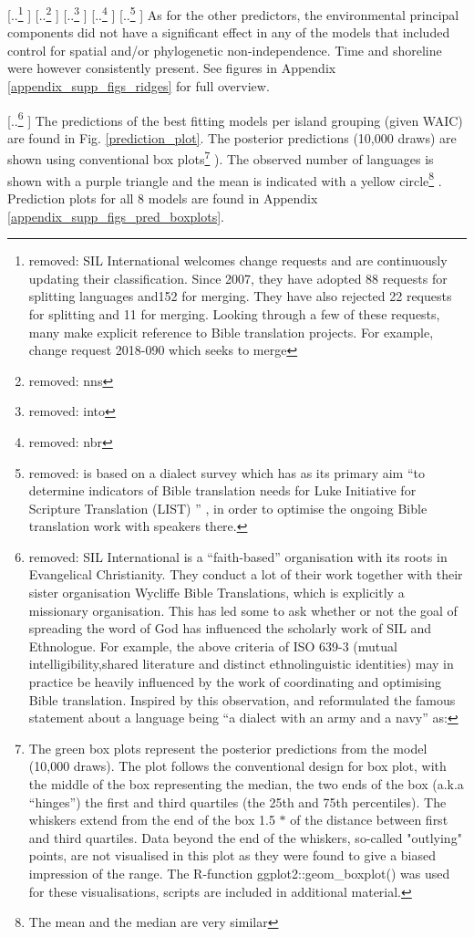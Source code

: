 \documentclass[unnumsec,webpdf,modern,medium]{oup-authoring-template}
\providecommand{\DIFaddtex}[1]{{\protect\color{blue} \sf #1}} %
\providecommand{\DIFdeltex}[1]{{\protect\color{red} [..\footnote{removed: #1} ]}} %
\providecommand{\DIFaddbegin}{} %
\providecommand{\DIFaddend}{} %
\providecommand{\DIFdelbegin}{} %
\providecommand{\DIFdelend}{} %
\providecommand{\DIFadd}[1]{\texorpdfstring{\DIFaddtex{#1}}{#1}} %
\providecommand{\DIFdel}[1]{\texorpdfstring{\DIFdeltex{#1}}{}} %
\newcommand{\DIFscaledelfig}{0.5}
\newlength{\DIFdelgraphicswidth} %
\newlength{\DIFdelgraphicsheight} %
\newcommand{\DIFaddincludegraphics}[2][]{{\color{blue}\fbox{\DIFOincludegraphics[#1]{#2}}}} %
\newcommand{\DIFdelincludegraphics}[2][]{%
\sbox{\DIFdelgraphicsbox}{\DIFOincludegraphics[#1]{#2}}%
\settoboxwidth{\DIFdelgraphicswidth}{\DIFdelgraphicsbox} %
\settoboxtotalheight{\DIFdelgraphicsheight}{\DIFdelgraphicsbox} %
\scalebox{\DIFscaledelfig}{%
\parbox[b]{\DIFdelgraphicswidth}{\usebox{\DIFdelgraphicsbox}\\[-\baselineskip] \rule{\DIFdelgraphicswidth}{0em}}\llap{\resizebox{\DIFdelgraphicswidth}{\DIFdelgraphicsheight}{%
\setlength{\unitlength}{\DIFdelgraphicswidth}%
\begin{picture}(1,1)%
\thicklines\linethickness{2pt} %
{\color[rgb]{1,0,0}\put(0,0){\framebox(1,1){}}}%
{\color[rgb]{1,0,0}\put(0,0){\line( 1,1){1}}}%
{\color[rgb]{1,0,0}\put(0,1){\line(1,-1){1}}}%
\end{picture}%
}\hspace*{3pt}}} %
} %
\DeclareRobustCommand{\DIFaddbegin}{\DIFOaddbegin \let\includegraphics\DIFaddincludegraphics} %
\DeclareRobustCommand{\DIFaddend}{\DIFOaddend \let\includegraphics\DIFOincludegraphics} %
\DeclareRobustCommand{\DIFdelbegin}{\DIFOdelbegin \let\includegraphics\DIFdelincludegraphics} %
\DeclareRobustCommand{\DIFdelend}{\DIFOaddend \let\includegraphics\DIFOincludegraphics} %
\begin{document}
\DIFdelbegin \DIFdel{SIL International welcomes change requests and are continuously updating their classification.
Since 2007, they have adopted 88 requests for splitting languages and152 for merging. They have also rejected 22 requests for splitting and 11 for merging.
Looking through a few of these requests, many make explicit reference to Bible translation projects. For example, change request 2018-090 which seeks to merge }%
\DIFdel{nns}%
\DIFdel{into }%
\DIFdel{nbr}%
\DIFdel{is based on a dialect survey which has as its primary aim ``to determine indicators of Bible translation needs for Luke Initiative for Scripture Translation (LIST) '' \citep{change_request_SIL_example}, in order to optimise the ongoing Bible translation work with speakers there. }\DIFdelend \DIFaddbegin \DIFadd{As for the other predictors, the environmental principal components did not have a significant effect in any of the models that included control for spatial and/or phylogenetic non-independence. Time and shoreline were however consistently present. See figures in Appendix \ref{appendix_supp_figs_ridges} for full overview.
}\DIFaddend 

\DIFdelbegin \DIFdel{SIL International is a ``faith-based'' organisation with its roots in Evangelical Christianity. They conduct a lot of their work together with their sister organisation Wycliffe Bible Translations, which is explicitly a missionary organisation. This has led some to ask whether or not the goal of spreading the word of God has influenced the scholarly work of SIL and Ethnologue. For example, the above criteria of ISO 639-3 (mutual intelligibility,shared literature and distinct ethnolinguistic identities) may in practice be heavily influenced by the work of coordinating and optimising Bible translation. Inspired by this observation, \citet{lupkestorch2013} and \citet{blommaert2008artefactual} reformulated the famous statement about a language being ``a dialect with an army and a navy'' as: 
}\DIFdelend \DIFaddbegin \DIFadd{The predictions of the best fitting models per island grouping (given WAIC) are found in Fig. \ref{prediction_plot}. The posterior predictions (10,000 draws) are shown using conventional box plots}\footnote{\DIFadd{The green box plots represent the posterior predictions from the model (10,000 draws). The plot follows the conventional design for box plot, with the middle of the box representing the median, the two ends of the box (a.k.a ``hinges'') the first and third quartiles (the 25th and 75th percentiles). The whiskers extend from the end of the box 1.5 $\ast$  of the distance between first and third quartiles. Data beyond the end of the whiskers, so-called "outlying" points, are not visualised in this plot as they were found to give a biased impression of the range. The R-function  ggplot2::geom\_boxplot() was used for these visualisations, scripts are included in additional material.}}\DIFadd{). The observed number of languages is shown with a purple triangle and the mean is indicated with a yellow circle}\footnote{\DIFadd{The mean and the median are very similar}}\DIFadd{. Prediction plots for all 8 models are found in Appendix \ref{appendix_supp_figs_pred_boxplots}.
}\DIFaddend 
\end{document}
